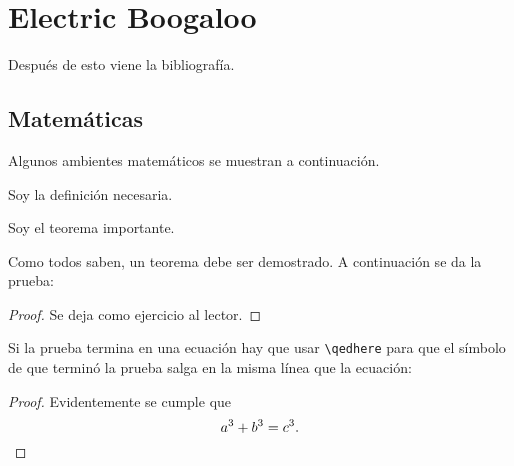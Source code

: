 \chapter{Electric Boogaloo}

\noindent Después de esto viene la bibliografía.

\section{Matemáticas}

\noindent Algunos ambientes matemáticos se muestran a continuación.

\begin{definition}
    Soy la definición necesaria.
\end{definition}

\begin{theorem}
    Soy el teorema importante.
\end{theorem}

Como todos saben, un teorema debe ser demostrado. A continuación se da la prueba:

\begin{proof}
    Se deja como ejercicio al lector.
\end{proof}

Si la prueba termina en una ecuación hay que usar \texttt{\textbackslash{}qedhere} para que el símbolo de que terminó la prueba salga en la misma línea que la ecuación:

\begin{proof}
    Evidentemente se cumple que 
    \[
        a^3 + b^3 = c^3. \qedhere
    \]
\end{proof}